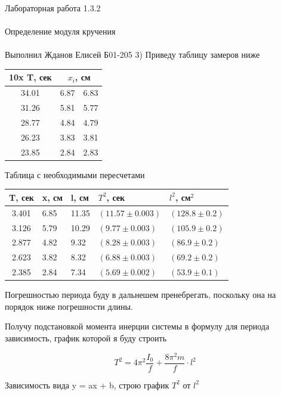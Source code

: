 \documentclass{astroedu-lab}
\begin{document}
\begin{problem}{\huge Лабораторная работа 1.3.2\\\\Определение модуля кручения\\\\Выполнил Жданов Елисей Б01-205}
3) Приведу таблицу замеров ниже

\begin{center}
\begin{tabular}[t]{|c|l|l|}
\hline
10x T, сек & \multicolumn{2}{|c|}{$x_i$, см} \\
\hline
34.01 & 6.87 & 6.83\\
31.26 & 5.81 & 5.77\\
28.77 & 4.84 & 4.79\\
26.23 & 3.83 & 3.81\\
23.85 & 2.84 & 2.83\\

\hline
\end{tabular}
\end{center}


Таблица с необходимыми пересчетами

\begin{center}
\begin{tabular}[t]{|c|l|l|l|l|}
\hline
T, сек & x, см & l, см & $T^2$, сек & $l^2$, см$^2$\\
\hline
3.401  & 6.85  & 11.35 & $(11.57 \pm 0.003)$ 	 & $(128.8 \pm 0.2)$ \\
3.126  & 5.79  & 10.29 & $(9.77 \pm  0.003)$	 & $(105.9 \pm 0.2)$ \\
2.877  & 4.82  & 9.32  & $(8.28 \pm  0.003)$	 & $(86.9 \pm 0.2)$ \\
2.623  & 3.82  & 8.32  & $(6.88 \pm  0.003)$	 & $(69.2 \pm 0.2)$ \\
2.385  & 2.84  & 7.34  & $(5.69 \pm  0.002)$	 & $(53.9 \pm 0.1)$ \\

\hline
\end{tabular}
\end{center}

Погрешностью периода буду в дальнешем пренебрегать, поскольку она на порядок ниже погрешности длины.

Получу подстановкой момента инерции системы в формулу для периода зависимость, график которой я буду строить

\begin{equation}
	T^2 = 4 \pi^2 \frac{I_0}{f} + \frac{8 \pi^2 m}{f} \cdot l^2
\end{equation}

Зависимость вида y = ax + b, строю график $T^2$ от $l^2$

\begin{center}
\end{center}


\end{problem}
\end{document}
